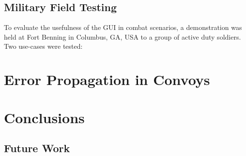 \documentclass[12pt]{report}
\begin{document}
\section{Military Field Testing}
\label{sec:benning}

To evaluate the usefulness of the GUI in combat scenarios, a demonstration was held at Fort Benning in Columbus, GA, USA to a group of active duty soldiers. Two use-cases were tested: 


\chapter{Error Propagation in Convoys}
\label{chap:errprop}




\chapter{Conclusions}
\label{chap:concl}


\section{Future Work}
\label{sec:futwork}





\nocite{travisdiss}
\nocite{travisshort}
\nocite{calgary}

\end{document}
